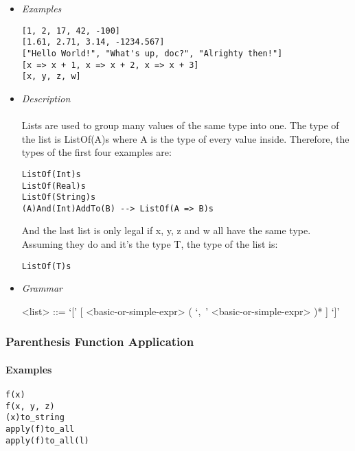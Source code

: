\documentclass{article}
\begin{document}
\begin{itemize}

\item \textit{Examples}
\begin{verbatim}
[1, 2, 17, 42, -100]
[1.61, 2.71, 3.14, -1234.567]
["Hello World!", "What's up, doc?", "Alrighty then!"]
[x => x + 1, x => x + 2, x => x + 3]
[x, y, z, w]
\end{verbatim}

\item \textit{Description} \\\\
Lists are used to group many values of the same type into one. 
The type of the list is ListOf(A)s where A is the type of every value inside.
Therefore, the types of the first four examples are:
\begin{verbatim}
ListOf(Int)s
ListOf(Real)s
ListOf(String)s
(A)And(Int)AddTo(B) --> ListOf(A => B)s
\end{verbatim}
And the last list is only legal if x, y, z and w all have the same type. Assuming 
they do and it's the type T, the type of the list is: 
\begin{verbatim}
ListOf(T)s
\end{verbatim}

\item \textit{Grammar}
\begin{grammar}
<list> ::= `[' [ <basic-or-simple-expr> ( `,\ ' <basic-or-simple-expr> )* ] `]'
\end{grammar}

\end{itemize}

\subsubsection{Parenthesis Function Application}
\label{subsec:parenfuncapp}

\paragraph{Examples}

\begin{verbatim}
f(x)
f(x, y, z)
(x)to_string
apply(f)to_all
apply(f)to_all(l)
\end{verbatim}
\end{document}

